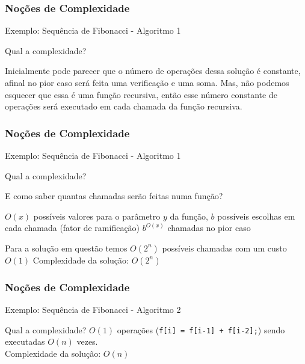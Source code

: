 \begin{frame}
\frametitle{Noções de Complexidade}

\begin{block}{Exemplo: Sequência de Fibonacci - Algoritmo 1}
\end{block}

\begin{block}{Qual a complexidade?}
\begin{itemize}
	\bitem Inicialmente pode parecer que o número de operações dessa solução é constante, afinal no pior caso será feita uma verificação e uma soma.
	\bitem Mas, não podemos esquecer que essa é uma função recursiva, então esse número constante de operações será executado em cada chamada da função recursiva.
\end{itemize}
\end{block}
\end{frame}

\begin{frame}
\frametitle{Noções de Complexidade}

\begin{block}{Exemplo: Sequência de Fibonacci - Algoritmo 1}
\end{block}
\begin{block}{Qual a complexidade?}
\begin{itemize}
	\bitem E como saber quantas chamadas serão feitas numa função?
	\begin{itemize}
		\bitem $O(x)$ possíveis valores para o parâmetro $y$ da função, 
		\bitem $b$ possíveis escolhas em cada chamada (fator de ramificação)
		\bitem $b^{O(x)}$ chamadas no pior caso
	\end{itemize}
	\bitem Para a solução em questão temos $O(2^n)$ possíveis chamadas com um custo $O(1)$
	\bitem Complexidade da solução: $O(2^n)$
\end{itemize}
\end{block}
\end{frame}

\begin{frame}
\frametitle{Noções de Complexidade}

\begin{block}{Exemplo: Sequência de Fibonacci - Algoritmo 2}
\end{block}

\begin{block}{Qual a complexidade?}
$O(1)$ operações (\tiny \texttt{f[i] = f[i-1] + f[i-2];}\normalsize) sendo executadas $O(n)$ vezes.\\
Complexidade da solução: $O(n)$
\end{block}
\end{frame}


